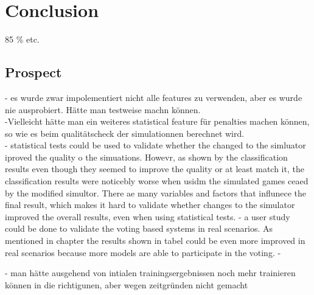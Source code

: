 \chapter{Conclusion}
85 \% etc.  

\section{Prospect}
- es wurde zwar impolementiert nicht alle features zu verwenden, aber es wurde nie ausprobiert. Hätte man testweise machn können. \\
-Vielleicht hätte man ein weiteres statistical feature für penalties machen können, so wie es beim qualitätscheck der simulationnen berechnet wird.\\
- statistical tests could be used to validate whether the changed to the simluator iproved the quality o the simuations. Howevr, as shown by the classification results even though they seemed to improve the quality or at least match it, the classification results were noticebly worse when usidm the simulated games ceaed by the modified simultor. There ae many variables and factors that influnece the final result, which makes it hard to validate whether changes to the simulator improved the overall results, even when using statistical tests. 
- a user study could be done to validate the voting based systems in real scenarios. As mentioned in chapter  the results shown in tabel  could be even more improved in real scenarios because more models are able to participate in the voting.  
-   


- man hätte ausgehend von intialen trainingsergebnissen noch mehr trainieren können in die richtigunen, aber wegen zeitgründen nicht gemacht 